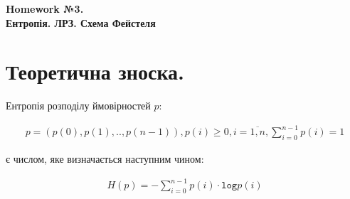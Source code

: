 \documentclass{../../test-template}
\begin{document}
\begin{center}
    \textbf{\Huge{Homework №3.} \\ \large Ентропія. ЛРЗ. Схема Фейстеля}
\end{center}

\section*{Теоретична зноска.}

\begin{tcolorbox}[breakable, colback=gray!10!white,fonttitle=\bfseries,colframe=purple!80!black,title=Ентропія]
 Ентропія розподілу ймовірностей $p$:

    \vspace{-9mm}
    \begin{align*}
        p=(p(0),p(1),..,p(n-1)),p(i)\geq 0,i=\overline{1,n},\sum_{i=0}^{n-1}p(i)=1
    \end{align*}

    \vspace{-3mm}
    є числом, яке визначається наступним чином:

    \vspace{-7mm}
    \begin{align*}
        H(p)=-\sum_{i=0}^{n-1}p(i)\cdot\texttt{log}p(i)
    \end{align*}
\end{tcolorbox}
\end{document}
